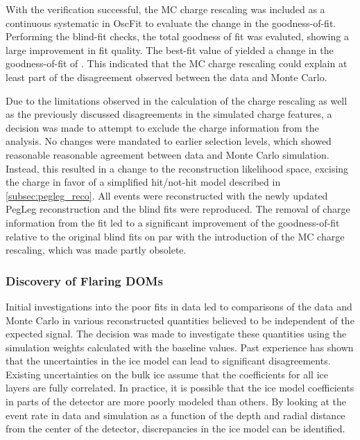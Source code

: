 With the verification successful, the MC charge rescaling was included as a continuous systematic in OscFit to evaluate the change in the goodness-of-fit.
Performing the blind-fit checks, the total goodness of fit was evaluted, showing a large improvement in fit quality.
The best-fit value of  yielded a change in the goodness-of-fit of .
This indicated that the MC charge rescaling could explain at least part of the disagreement observed between the data and Monte Carlo.

Due to the limitations observed in the calculation of the charge rescaling as well as the previously discussed disagreements in the simulated charge features, a decision was made to attempt to exclude the charge information from the analysis.
No changes were mandated to earlier selection levels, which showed reasonable reasonable agreement between data and Monte Carlo simulation.
Instead, this resulted in a change to the reconstruction likelihood space, excising the charge in favor of a simplified hit/not-hit model described in \ref{subsec:pegleg_reco}.
All events were reconstructed with the newly updated PegLeg reconstruction and the blind fits were reproduced.
The removal of charge information from the fit led to a significant improvement of the goodness-of-fit relative to the original blind fits on par with the introduction of the MC charge rescaling, which was made partly obsolete.

\label{subsubsec:flaring_doms}
\subsubsection{Discovery of Flaring DOMs}
Initial investigations into the poor fits in data led to comparisons of the data and Monte Carlo in various reconstructed quantities believed to be independent of the expected signal.
The decision was made to investigate these quantities using the simulation weights calculated with the baseline values.
Past experience has shown that the uncertainties in the ice model can lead to significant disagreements.
Existing uncertainties on the bulk ice assume that the coefficients for all ice layers are fully correlated.
In practice, it is possible that the ice model coefficients in parts of the detector are more poorly modeled than others.
By looking at the event rate in data and simulation as a function of the depth and radial distance from the center of the detector, discrepancies in the ice model can be identified.

